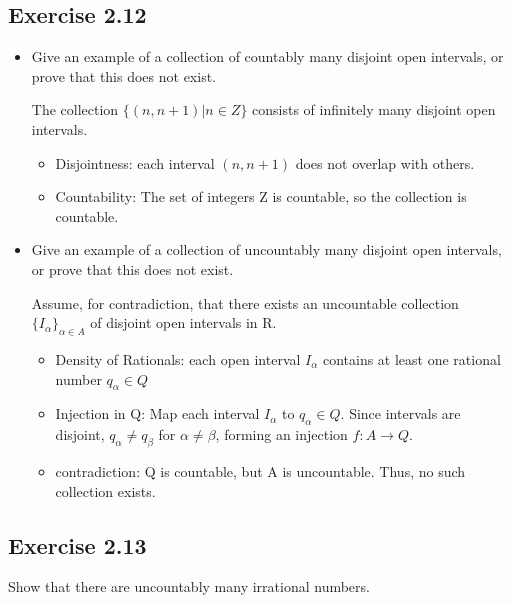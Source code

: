\documentclass[12pt]{article}
\begin{document}
		\subsection*{Exercise 2.12}
			\begin{itemize}
				\item Give an example of a collection of countably many disjoint open intervals, or prove that this does not exist.
				
					The collection $\{(n, n+1)| n \in Z\}$ consists of infinitely many disjoint open intervals.
					\begin{itemize}
						\item Disjointness: each interval $(n, n+1)$ does not overlap with others.
						\item Countability: The set of integers Z is countable, so the collection is countable.
					\end{itemize}
				\item Give an example of a collection of uncountably many disjoint open intervals, or prove that this does not exist.
				
					Assume, for contradiction, that there exists an uncountable collection $\{I_{\alpha}\}_{\alpha \in A}$ of disjoint open intervals in R.
					\begin{itemize}
						\item Density of Rationals: each open interval $I_{\alpha}$ contains at least one rational number $q_{\alpha} \in Q$
						\item Injection in Q: Map each interval $I_{\alpha}$ to $q_{\alpha} \in Q$. Since intervals are disjoint, $q_{\alpha} \ne q_{\beta}$ for $\alpha \ne \beta$, forming an injection $f:A \rightarrow Q$.
						\item contradiction: Q is countable, but A is uncountable. Thus, no such collection exists.
					\end{itemize}
			\end{itemize}
		\subsection*{Exercise 2.13}
			Show that there are uncountably many irrational numbers.
			
\end{document}
